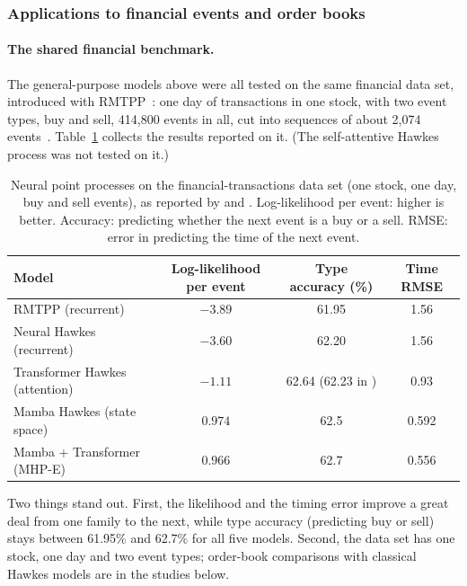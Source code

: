 \subsubsection{Applications to financial events and order books}
\label{sec:npp-apps}

\paragraph{The shared financial benchmark.} The general-purpose models above were all tested on the same
financial data set, introduced with RMTPP~\citep{du2016rmtpp}: one day of transactions in one stock, with two
event types, buy and sell, 414{,}800 events in all, cut into sequences of about 2{,}074
events~\citep{zuo2020thp}. Table~\ref{tab:npp-fin} collects the results reported on it. (The self-attentive Hawkes
process was not tested on it.)

\begin{table}[!htbp]
\centering\footnotesize
\caption{Neural point processes on the financial-transactions data set (one stock, one day, buy and sell events),
as reported by \citet{zuo2020thp} and \citet{gao2024mhp}. Log-likelihood per event: higher is better. Accuracy:
predicting whether the next event is a buy or a sell. RMSE: error in predicting the time of the next event.}
\label{tab:npp-fin}
\begin{tabular}{lccc}
\toprule
Model & Log-likelihood per event & Type accuracy (\%) & Time RMSE \\
\midrule
RMTPP (recurrent) & $-3.89$ & 61.95 & 1.56 \\
Neural Hawkes (recurrent) & $-3.60$ & 62.20 & 1.56 \\
Transformer Hawkes (attention) & $-1.11$ & 62.64 (62.23 in \citealp{gao2024mhp}) & 0.93 \\
Mamba Hawkes (state space) & $0.974$ & 62.5 & 0.592 \\
Mamba + Transformer (MHP-E) & $0.966$ & 62.7 & 0.556 \\
\bottomrule
\end{tabular}
\end{table}

Two things stand out. First, the likelihood and the timing error improve a great deal from one family to the next,
while type accuracy (predicting buy or sell) stays between 61.95\% and 62.7\% for all five models.
Second, the data set has one stock, one day and two event types; order-book comparisons with classical
Hawkes models are in the studies below.

